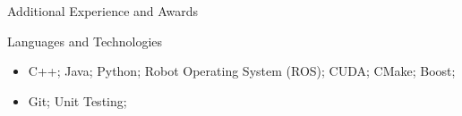 \documentclass[]{mcdowellcv}
\begin{document}
	\begin{cvsection}{Additional Experience and Awards}
		\begin{cvsubsection}{}{}{}	
			\begin{itemize}	
                     
			\end{itemize}
		\end{cvsubsection}
	\end{cvsection}
	
	\begin{cvsection}{Languages and Technologies}
		\begin{cvsubsection}{}{}{}	
			\begin{itemize}
                \item C++; Java; Python; Robot Operating System (ROS); CUDA; CMake; Boost; 
				\item Git; Unit Testing;
			\end{itemize}
		\end{cvsubsection}
	\end{cvsection}
	
\end{document}
